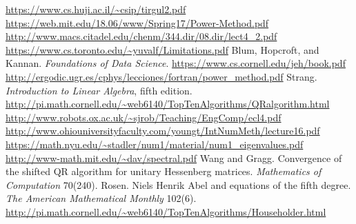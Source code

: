 \documentclass{article}
\begin{document}
\begin{thebibliography}{9}
   \url{https://www.cs.huji.ac.il/\~csip/tirgul2.pdf}
   \url{https://web.mit.edu/18.06/www/Spring17/Power-Method.pdf}
   \url{http://www.macs.citadel.edu/chenm/344.dir/08.dir/lect4_2.pdf}
   \url{https://www.cs.toronto.edu/\~yuvalf/Limitations.pdf}
   Blum, Hopcroft, and Kannan. \emph{Foundations of Data Science}. \url{https://www.cs.cornell.edu/jeh/book.pdf}
   \url{http://ergodic.ugr.es/cphys/lecciones/fortran/power_method.pdf}
   Strang. \emph{Introduction to Linear Algebra}, fifth edition.
   \url{http://pi.math.cornell.edu/\~web6140/TopTenAlgorithms/QRalgorithm.html}
   \url{http://www.robots.ox.ac.uk/\~sjrob/Teaching/EngComp/ecl4.pdf}
   \url{http://www.ohiouniversityfaculty.com/youngt/IntNumMeth/lecture16.pdf}
   \url{https://math.nyu.edu/\~stadler/num1/material/num1_eigenvalues.pdf}
   \url{http://www-math.mit.edu/\~dav/spectral.pdf}
   Wang and Gragg. Convergence of the shifted QR algorithm for unitary Hessenberg matrices. \emph{Mathematics of Computation} 70(240).
   Rosen. Niels Henrik Abel and equations of the fifth degree. \emph{The American Mathematical Monthly} 102(6).
   \url{http://pi.math.cornell.edu/\~web6140/TopTenAlgorithms/Householder.html}
\end{thebibliography}
\end{document}
